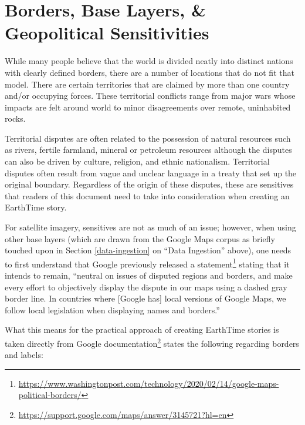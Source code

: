 \documentclass[
]{krantz}
\renewcommand{\href}[2]{#2\footnote{\url{#1}}}
\begin{document}
\hypertarget{borders-base-layers-geopolitical-sensitivities}{%
\section{Borders, Base Layers, \& Geopolitical Sensitivities}\label{borders-base-layers-geopolitical-sensitivities}}

While many people believe that the world is divided neatly into distinct nations with clearly defined borders, there are a number of locations that do not fit that model. There are certain territories that are claimed by more than one country and/or occupying forces. These territorial conflicts range from major wars whose impacts are felt around world to minor disagreements over remote, uninhabited rocks.

Territorial disputes are often related to the possession of natural resources such as rivers, fertile farmland, mineral or petroleum resources although the disputes can also be driven by culture, religion, and ethnic nationalism. Territorial disputes often result from vague and unclear language in a treaty that set up the original boundary. Regardless of the origin of these disputes, these are sensitives that readers of this document need to take into consideration when creating an EarthTime story.

For satellite imagery, sensitives are not as much of an issue; however, when using other base layers (which are drawn from the Google Maps corpus as briefly touched upon in Section \ref{data-ingestion} on ``Data Ingestion'' above), one needs to first understand that Google previously \href{https://www.washingtonpost.com/technology/2020/02/14/google-maps-political-borders/}{released a statement} stating that it intends to remain, ``neutral on issues of disputed regions and borders, and make every effort to objectively display the dispute in our maps using a dashed gray border line. In countries where {[}Google has{]} local versions of Google Maps, we follow local legislation when displaying names and borders.''

What this means for the practical approach of creating EarthTime stories is taken directly from \href{https://support.google.com/maps/answer/3145721?hl=en}{Google documentation} states the following regarding borders and labels:
\end{document}
